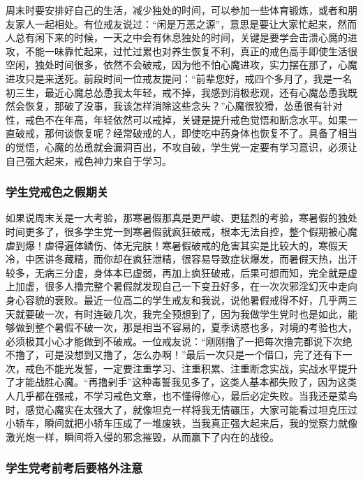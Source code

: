 周末时要安排好自己的生活，减少独处的时间，可以参加一些体育锻炼，或者和朋友家人一起相处。有位戒友说过：“闲是万恶之源”，意思是要让大家忙起来，然而人总有闲下来的时候，一天之中会有休息独处的时间，关键是要学会击溃心魔的进攻，不能一味靠忙起来，过忙过累也对养生恢复不利，真正的戒色高手即使生活很空闲，独处时间很多，依然不会破戒，因为他不怕心魔进攻，实力摆在那了，心魔进攻只是来送死。前段时间一位戒友提问：“前辈您好，戒四个多月了，我是一名初三生，最近心魔总怂恿我太年轻，戒不掉，我感到消极悲观，还有心魔怂恿我既然会恢复，那破了没事，我该怎样消除这些念头？”心魔很狡猾，怂恿很有针对性，戒色不在年高，年轻依然可以戒掉，关键是提升戒色觉悟和断念水平。如果一直破戒，那何谈恢复呢？经常破戒的人，即使吃中药身体也恢复不了。具备了相当的觉悟，心魔的怂恿就会漏洞百出，不攻自破，学生党一定要有学习意识，必须让自己强大起来，戒色神力来自于学习。

\subsubsection{学生党戒色之假期关}

如果说周末关是一大考验，那寒暑假那真是更严峻、更猛烈的考验，寒暑假的独处时间更多了，很多学生党一到寒暑假就疯狂破戒，根本无法自控，整个假期被心魔虐到爆！虐得遍体鳞伤、体无完肤！寒暑假破戒的危害其实是比较大的，寒假天冷，中医讲冬藏精，而你却在疯狂泄精，很容易导致症状爆发，而暑假天热，出汗较多，无病三分虚，身体本已虚弱，再加上疯狂破戒，后果可想而知，完全就是虚上加虚，很多人撸完整个暑假就发现自己一下变丑好多，在一次次邪淫幻灭中走向身心容貌的衰败。最近一位高二的学生戒友和我说，说他暑假戒得不好，几乎两三天就要破一次，有时连破几次，我完全预想到了，因为我做学生党时也是如此，能够做到整个暑假不破一次，那是相当不容易的，夏季诱惑也多，对境的考验也大，必须极其小心才能做到不破戒。一位戒友说：“刚刚撸了一把每次撸完都说下次绝不撸了，可是没想到又撸了，怎么办啊！”最后一次只是一个借口，完了还有下一次，戒色不能光发誓，一定要注重学习、注重积累、注重断念实战，实战水平提升了才能战胜心魔。“再撸剁手”这种毒誓我见多了，这类人基本都失败了，因为这类人几乎都在强戒，不学习戒色文章，也不懂得修心，最后必定失败。当我还是菜鸟时，感觉心魔实在太强大了，就像坦克一样将我无情碾压，大家可能看过坦克压过小轿车，瞬间就把小轿车压成了一堆废铁，当我真正强大起来后，我的觉察力就像激光炮一样，瞬间将入侵的邪念摧毁，从而赢下了内在的战役。

\subsubsection{学生党考前考后要格外注意}

